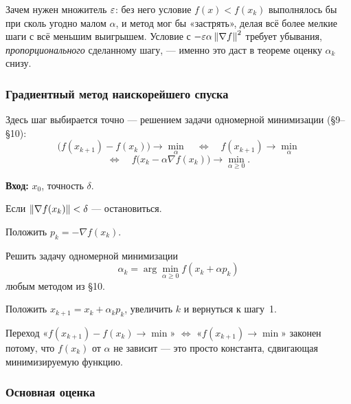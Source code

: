 \begin{idea}
Зачем нужен множитель $\varepsilon$: без него условие $f(x) < f(x_k)$ выполнялось бы
при сколь угодно малом $\alpha$, и метод мог бы «застрять», делая всё более
мелкие шаги с всё меньшим выигрышем. Условие с $-\varepsilon\alpha\left\lVert \nabla f \right\rVert^2$
требует убывания, \emph{пропорционального} сделанному шагу, — именно это
даст в теореме оценку $\alpha_k$ снизу.
\end{idea}

\subsubsection*{Градиентный метод наискорейшего спуска}

Здесь шаг выбирается точно — решением задачи одномерной минимизации
(\S9--\S10):
\[
  \big(f(x_{k+1}) - f(x_k)\big) \longrightarrow \min_{\alpha}
  \quad\Longleftrightarrow\quad
  f(x_{k+1}) \longrightarrow \min_{\alpha}
\]
\[
  \Longleftrightarrow\quad
  f\big(x_k - \alpha \nabla f(x_k)\big) \longrightarrow \min_{\alpha \ge 0} .
\]

\begin{algo}[title={Градиентный метод наискорейшего спуска}]
\textbf{Вход:} $x_0$, точность $\delta$.

\begin{steps}
  \item Если $\left\lVert \nabla f(x_k) \right\rVert < \delta$ — остановиться.
  \item Положить $p_k = -\nabla f(x_k)$.
  \item Решить задачу одномерной минимизации
        \[
          \alpha_k = \arg\min_{\alpha \ge 0} f(x_k + \alpha p_k)
        \]
        любым методом из \S10.
  \item Положить $x_{k+1} = x_k + \alpha_k p_k$, увеличить $k$ и вернуться
        к шагу~1.
\end{steps}
\end{algo}


\begin{idea}
Переход «$f(x_{k+1}) - f(x_k) \to \min$» $\iff$ «$f(x_{k+1}) \to \min$»
законен потому, что $f(x_k)$ от $\alpha$ не зависит — это просто константа,
сдвигающая минимизируемую функцию.
\end{idea}

\subsubsection*{Основная оценка}

